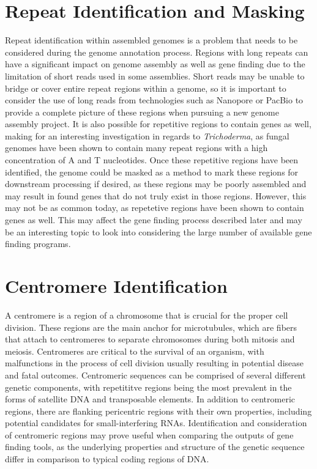 \section{Repeat Identification and Masking}
Repeat identification within assembled genomes is a problem that needs
to be considered during the genome annotation process. Regions with
long repeats can have a significant impact on genome assembly as well
as gene finding due to the limitation of short reads used in some
assemblies\cite{Treangen2011}. Short reads may be unable to bridge or
cover entire repeat regions within a genome, so it is important to
consider the use of long reads from technologies such as Nanopore or
PacBio\texttrademark \cite{Rhoads2015} to provide a complete picture of
these regions when pursuing a new genome assembly project. It is also
possible for repetitive regions to contain genes as well, making for
an interesting investigation in regards to \textit{Trichoderma}, as
fungal genomes have been shown to contain many repeat regions with a
high concentration of A and T
nucleotides\cite{10.1371/journal.pgen.1007467}. Once these repetitive
regions have been identified, the genome could be masked as a method
to mark these regions for downstream processing if desired, as these
regions may be poorly assembled and may result in found genes that do
not truly exist in those regions. However, this may not be as common
today, as repetetive regions have been shown to contain genes as
well\cite{Slotkin2018}. This may affect the gene finding process
described later and may be an interesting topic to look into
considering the large number of available gene finding programs.

\section{Centromere Identification}
A centromere is a region of a chromosome that is crucial for the
proper cell division. These regions are the main anchor for
microtubules, which are fibers that attach to centromeres to separate
chromosomes during both mitosis and meiosis. Centromeres are critical
to the survival of an organism, with malfunctions in the process of
cell division usually resulting in potential disease and fatal
outcomes\cite{Plohl2014}. Centromeric sequences can be comprised of
several different genetic components, with repetititve regions being
the most prevalent in the forms of satellite DNA and transposable
elements. In addition to centromeric regions, there are flanking
pericentric regions with their own properties, including potential
candidates for small-interfering RNAs\cite{Plohl2014}. Identification
and consideration of centromeric regions may prove useful when
comparing the outputs of gene finding tools, as the underlying
properties and structure of the genetic sequence differ in comparison
to typical coding regions of DNA.

